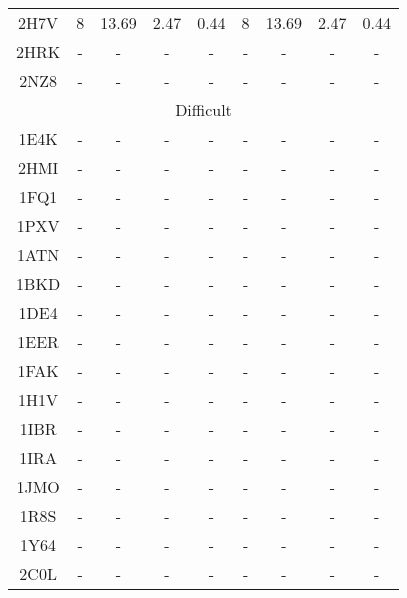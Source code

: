 \begin{longtable}{c c c c c|c c c c}
 {\tiny 2H7V} &{\tiny 8}&{\tiny 13.69}&{\tiny 2.47}&{\tiny 0.44} &{\tiny 8}&{\tiny 13.69}&{\tiny 2.47}&{\tiny 0.44}\\ 
 {\tiny 2HRK} &{\tiny -}&{\tiny -}&{\tiny -}&{\tiny -} &{\tiny -}&{\tiny -}&{\tiny -}&{\tiny -}\\ 
 {\tiny 2NZ8} &{\tiny -}&{\tiny -}&{\tiny -}&{\tiny -} &{\tiny -}&{\tiny -}&{\tiny -}&{\tiny -}\\ 
 \multicolumn{9}{c}{Difficult}\\
{\tiny 1E4K} &{\tiny -}&{\tiny -}&{\tiny -}&{\tiny -} &{\tiny -}&{\tiny -}&{\tiny -}&{\tiny -}\\ 
 {\tiny 2HMI} &{\tiny -}&{\tiny -}&{\tiny -}&{\tiny -} &{\tiny -}&{\tiny -}&{\tiny -}&{\tiny -}\\ 
 {\tiny 1FQ1} &{\tiny -}&{\tiny -}&{\tiny -}&{\tiny -} &{\tiny -}&{\tiny -}&{\tiny -}&{\tiny -}\\ 
 {\tiny 1PXV} &{\tiny -}&{\tiny -}&{\tiny -}&{\tiny -} &{\tiny -}&{\tiny -}&{\tiny -}&{\tiny -}\\ 
 {\tiny 1ATN} &{\tiny -}&{\tiny -}&{\tiny -}&{\tiny -} &{\tiny -}&{\tiny -}&{\tiny -}&{\tiny -}\\ 
 {\tiny 1BKD} &{\tiny -}&{\tiny -}&{\tiny -}&{\tiny -} &{\tiny -}&{\tiny -}&{\tiny -}&{\tiny -}\\ 
 {\tiny 1DE4} &{\tiny -}&{\tiny -}&{\tiny -}&{\tiny -} &{\tiny -}&{\tiny -}&{\tiny -}&{\tiny -}\\ 
 {\tiny 1EER} &{\tiny -}&{\tiny -}&{\tiny -}&{\tiny -} &{\tiny -}&{\tiny -}&{\tiny -}&{\tiny -}\\ 
 {\tiny 1FAK} &{\tiny -}&{\tiny -}&{\tiny -}&{\tiny -} &{\tiny -}&{\tiny -}&{\tiny -}&{\tiny -}\\ 
 {\tiny 1H1V} &{\tiny -}&{\tiny -}&{\tiny -}&{\tiny -} &{\tiny -}&{\tiny -}&{\tiny -}&{\tiny -}\\ 
 {\tiny 1IBR} &{\tiny -}&{\tiny -}&{\tiny -}&{\tiny -} &{\tiny -}&{\tiny -}&{\tiny -}&{\tiny -}\\ 
 {\tiny 1IRA} &{\tiny -}&{\tiny -}&{\tiny -}&{\tiny -} &{\tiny -}&{\tiny -}&{\tiny -}&{\tiny -}\\ 
 {\tiny 1JMO} &{\tiny -}&{\tiny -}&{\tiny -}&{\tiny -} &{\tiny -}&{\tiny -}&{\tiny -}&{\tiny -}\\ 
 {\tiny 1R8S} &{\tiny -}&{\tiny -}&{\tiny -}&{\tiny -} &{\tiny -}&{\tiny -}&{\tiny -}&{\tiny -}\\ 
 {\tiny 1Y64} &{\tiny -}&{\tiny -}&{\tiny -}&{\tiny -} &{\tiny -}&{\tiny -}&{\tiny -}&{\tiny -}\\ 
 {\tiny 2C0L} &{\tiny -}&{\tiny -}&{\tiny -}&{\tiny -} &{\tiny -}&{\tiny -}&{\tiny -}&{\tiny -}\\ 

\end{longtable}
